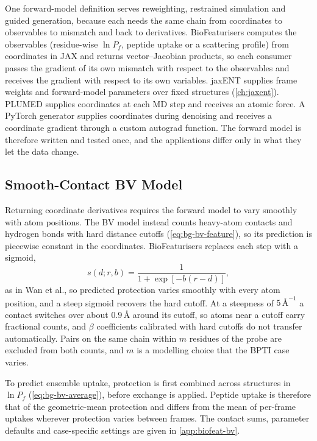 One forward-model definition serves reweighting, restrained simulation and guided generation, because each needs the same chain from coordinates to observables to mismatch and back to derivatives. BioFeaturisers computes the observables (residue-wise $\ln P_f$, peptide uptake or a scattering profile) from coordinates in JAX\supercite{bradburyJAXComposableTransformations2018} and returns vector--Jacobian products, so each consumer passes the gradient of its own mismatch with respect to the observables and receives the gradient with respect to its own variables. jaxENT supplies frame weights and forward-model parameters over fixed structures (\cref{ch:jaxent}). PLUMED\supercite{bonomiPromotingTransparencyReproducibility2019} supplies coordinates at each MD step and receives an atomic force.
A PyTorch generator supplies coordinates during denoising and receives a coordinate gradient through a custom autograd function. %
The forward model is therefore written and tested once, and the applications differ only in what they let the data change.

\subsection{Smooth-Contact BV Model}
\label{sec:biofeat-bv}

Returning coordinate derivatives requires the forward model to vary smoothly with atom positions. The BV model instead counts heavy-atom contacts and hydrogen bonds with hard distance cutoffs (\cref{eq:bg-bv-feature}),\supercite{bestStructuralInterpretationHydrogen2006} so its prediction is piecewise constant in the coordinates. BioFeaturisers replaces each step with a sigmoid,
\begin{equation}
    s(d;r,b)=\frac{1}{1+\exp[-b(r-d)]},
    \label{eq:biofeat-switch}
\end{equation}
as in Wan et al.,\supercite{wanReconcilingSimulatedEnsembles2020} so predicted protection varies smoothly with every atom position, and a steep sigmoid recovers the hard cutoff. At a steepness of $5\,\text{\AA}^{-1}$ a contact switches over about $0.9\,\text{\AA}$ around its cutoff, so atoms near a cutoff carry fractional counts, and $\beta$ coefficients calibrated with hard cutoffs do not transfer automatically. Pairs on the same chain within $m$ residues of the probe are excluded from both counts, and $m$ is a modelling choice that the BPTI case varies.

To predict ensemble uptake, protection is first combined across structures in $\ln P_f$ (\cref{eq:bg-bv-average}), before exchange is applied. Peptide uptake is therefore that of the geometric-mean protection and differs from the mean of per-frame uptakes wherever protection varies between frames. The contact sums, parameter defaults and case-specific settings are given in \cref{app:biofeat-bv}.

